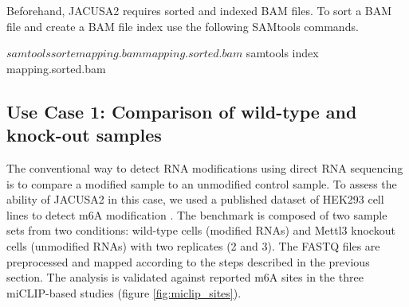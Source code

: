 \documentclass[times, 11pt, a4paper]{article}
\begin{document}
\begin{enumerate}
	Beforehand, JACUSA2 requires sorted and indexed BAM files. To sort a BAM file and create a BAM file index use the following SAMtools commands.
	\begin{spverbatim}
	$ samtools sorte mapping.bam mapping.sorted.bam
	$ samtools index mapping.sorted.bam
	\end{spverbatim}
\end{enumerate}	
\subsection*{Use Case 1: Comparison of wild-type and knock-out samples}
The conventional way to detect RNA modifications using direct RNA sequencing is to compare a modified sample to an unmodified control sample. To assess the ability of JACUSA2 in this case, we used a published dataset of HEK293 cell lines to detect m6A modification \citep{pratanwanich2021identification}. The benchmark is composed of two sample sets from two conditions: wild-type cells (modified RNAs) and Mettl3 knockout cells (unmodified RNAs) with two replicates (2 and 3). The FASTQ files are preprocessed and mapped according to the steps described in the previous section. The analysis is validated against reported m6A sites in the three miCLIP-based studies \cite{boulias2019identification,koh2019atlas,kortel2021deep} (figure \ref{fig:miclip_sites}).
 
\end{document}
